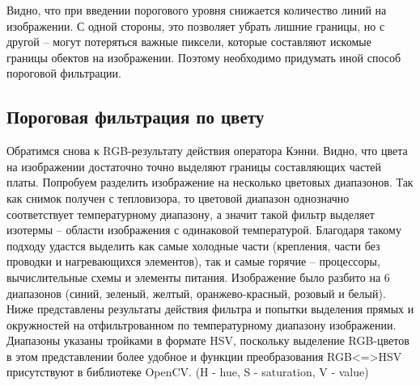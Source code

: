 



Видно, что при введении порогового уровня снижается количество линий на изображении. С одной стороны, это позволяет убрать лишние границы, но с другой -- могут потеряться важные пиксели, которые составляют искомые границы обектов на изображении. Поэтому необходимо придумать иной способ пороговой фильтрации.
\newline

\subsection{Пороговая фильтрация по цвету}
Обратимся снова к RGB-результату действия оператора Кэнни. Видно, что цвета на изображении достаточно точно выделяют границы составляющих частей платы. 
\newline 
Попробуем разделить изображение на несколько цветовых диапазонов. Так как снимок получен с тепловизора, то цветовой диапазон однозначно соответствует температурному диапазону, а значит такой фильтр выделяет изотермы -- области изображения с одинаковой температурой. Благодаря такому подходу удастся выделить как самые холодные части (крепления, части без проводки и нагревающихся элементов), так и самые горячие -- процессоры, вычислительные схемы и элементы питания. 
\newline
Изображение было разбито на 6 диапазонов (синий, зеленый, желтый, оранжево-красный, розовый и белый). Ниже представлены результаты действия фильтра и попытки выделения прямых и окружностей на отфильтрованном по температурному диапазону изображении. Диапазоны указаны тройками в формате HSV, поскольку выделение RGB-цветов в этом представлении более удобное и функции преобразования RGB<=>HSV присутствуют в библиотеке OpenCV. (H - hue, S - saturation, V - value)
\newline



